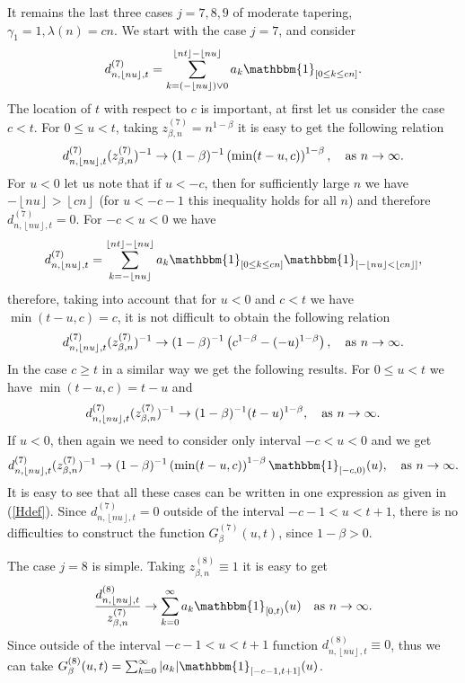 \documentclass[12pt]{article}
\def\b{\beta}
\def\g{\gamma}
\def\l{\lambda}
\newcommand{\ind}[1]{\mathbbm{1}_{#1}}
\newcommand{\sv}[1]{\left\lfloor #1 \right\rfloor}
\theoremstyle{plain}
\theoremstyle{definition}
\begin{document}
It remains the last three cases $j=7, 8, 9$ of moderate tapering, $\g_1=1, \l(n)=cn$. We start with the case $j=7$, and consider
$$
d_{n, \sv{nu}, t}^{(7)} =\sum_{k=\left( -\sv{nu} \right)\vee 0 }^{\sv{nt}-\sv{nu}} a_{k}\ind{[0\le k \le cn]}.
$$
The location of $t$ with respect to $c$ is important, at first let us consider the case $c<t$. For $0\le u<t$, taking $z_{\b, n}^{(7)}=n^{1-\b}$ it is easy to get the following relation
$$
d_{n, \sv{nu}, t}^{(7)}(z_{\b, n}^{(7)})^{-1}\rightarrow (1-\b)^{-1}\left (\min (t-u, c)\right )^{1-\b}, \quad  {\rm as} \ n\to \infty.
$$
For $u<0$ let us note that if $u<-c$, then for sufficiently large $n$ we have $-\sv{nu}>\sv{cn}$ (for $u<-c-1$ this inequality holds for all $n$) and therefore $d_{n, \sv{nu}, t}^{(7)}=0$. For $-c<u<0$ we have
$$
d_{n, \sv{nu}, t}^{(7)}=\sum_{k= -\sv{nu} }^{\sv{nt}-\sv{nu}} a_{k}\ind{[0\le k \le cn]}\ind {[-\sv{nu}<\sv{cn}]},
$$
therefore, taking into account that for $u<0$ and $c<t$ we have $\min (t-u, c)=c$,   it is not difficult to obtain the following relation
$$
d_{n, \sv{nu}, t}^{(7)}(z_{\b, n}^{(7)})^{-1}\rightarrow (1-\b)^{-1}\left ( c^{1-\b}- (-u)^{1-\b}\right ), \quad  {\rm as} \ n\to \infty.
$$
In the case $c\ge t$ in a similar way we get the following results. For $0\le u<t$ we have $\min (t-u, c)=t-u$ and
$$
d_{n, \sv{nu}, t}^{(7)}(z_{\b, n}^{(7)})^{-1}\rightarrow (1-\b)^{-1}(t-u)^{1-\b}, \quad  {\rm as} \ n\to \infty.
$$
If $u<0$, then again we need to consider only interval $-c<u<0$ and we get
$$
d_{n, \sv{nu}, t}^{(7)}(z_{\b, n}^{(7)})^{-1}\rightarrow (1-\b)^{-1}\left (\min (t-u, c)\right )^{1-\b}\ind{[-c, 0)}(u), \quad  {\rm as} \ n\to \infty.
$$
It is easy to see that all these cases can be written in one expression as given in (\ref{Hdef}). Since  $d_{n, \sv{nu}, t}^{(7)}=0$ outside of the interval $-c-1<u<t+1$, there is no difficulties to construct the function $G_{\b}^{(7)}(u,t)$, since $1-\b>0$.

The case $j=8$ is simple. Taking $z_{\b, n}^{(8)}\equiv 1$ it is easy to get
$$
\frac{d_{n, \sv{nu}, t}^{(8)}}{z_{\b, n}^{(7)}}\rightarrow \sum_{k=0}^{\infty}a_k\ind{[0,t)}(u) \quad  {\rm as} \ n\to \infty.
$$
Since outside of the interval $-c-1<u<t+1$ function $d_{n, \sv{nu}, t}^{(8)}\equiv 0$, thus we can take $G_{\b}^{(8)}(u,t)=\sum_{k=0}^{\infty}|a_k|\ind{[-c-1, t+1]}(u)$.
\end{document}
